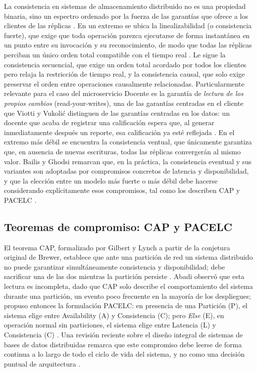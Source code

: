 \documentclass[11pt,a4paper]{article}
\begin{document}
La consistencia en sistemas de almacenamiento distribuido no es una propiedad binaria, sino
un espectro ordenado por la fuerza de las garantías que ofrece a los clientes de las réplicas
\cite{viotti2016}. En un extremo se ubica la linealizabilidad (o consistencia fuerte), que
exige que toda operación parezca ejecutarse de forma instantánea en un punto entre su invocación y su reconocimiento, de modo que todas las réplicas perciban un único orden total compatible con el tiempo real \cite{viotti2016}. Le sigue la consistencia secuencial, que exige un orden total acordado por todos los clientes pero relaja la restricción de tiempo real, y la consistencia causal, que solo exige preservar el orden entre operaciones causalmente relacionadas. Particularmente relevante para el caso del microservicio Docente es la garantía de \emph{lectura de los propios cambios} (read-your-writes), una de las garantías centradas en el cliente que Viotti y Vukolić distinguen de las garantías centradas en los datos: un docente que acaba de registrar una calificación espera que, al generar inmediatamente después un reporte, esa calificación ya esté reflejada \cite{viotti2016}. En el
extremo más débil se encuentra la consistencia ventual, que únicamente garantiza que, en ausencia de nuevas escrituras, todas las réplicas convergerán al mismo valor. Bailis y Ghodsi remarcan que, en la práctica, la consistencia eventual y sus variantes son adoptadas por
compromisos concretos de latencia y disponibilidad, y que la elección entre un modelo más fuerte o más débil debe hacerse considerando explícitamente esos compromisos, tal como los describen CAP y PACELC \cite{bailis2013}.

\subsection{Teoremas de compromiso: CAP y PACELC}

El teorema CAP, formalizado por Gilbert y Lynch a partir de la conjetura original de Brewer, establece que ante una partición de red un sistema distribuido no puede garantizar simultáneamente consistencia y disponibilidad; debe sacrificar una de las dos mientras la partición persiste \cite{gilbert2002}. Abadi observó que esta lectura es incompleta, dado que CAP solo describe el comportamiento del sistema durante una partición, un evento poco frecuente en la mayoría de los despliegues; propuso entonces la formulación PACELC: en presencia de una Partición (P), el sistema elige entre Availability (A) y Consistencia (C); pero \emph{Else} (E), en operación normal sin particiones, el sistema elige entre Latencia (L) y Consistencia
(C) \cite{abadi2012}. Una revisión reciente sobre el diseño integral de sistemas de bases de datos distribuidas remarca que este compromiso debe leerse de forma continua a lo largo de todo el ciclo de vida del sistema, y no como una decisión puntual de arquitectura
\cite{carvalho2025}.
\end{document}
